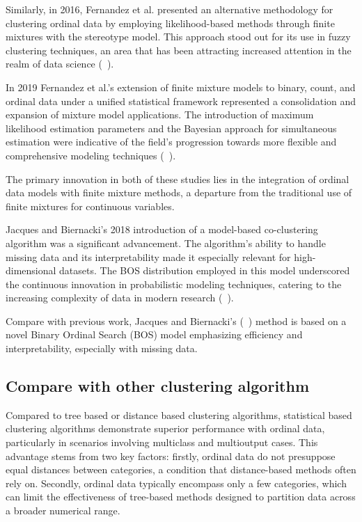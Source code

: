 \documentclass{article}
\begin{document}
Similarly, in 2016, Fernandez et al. presented an alternative methodology for clustering ordinal data by employing likelihood-based methods through finite mixtures with the stereotype model. This approach stood out for its use in fuzzy clustering techniques, an area that has been attracting increased attention in the realm of data science (~\cite{fernandez2016mixture}).

In 2019 Fernandez et al.'s extension of finite mixture models to binary, count, and ordinal data under a unified statistical framework represented a consolidation and expansion of mixture model applications. The introduction of maximum likelihood estimation parameters and the Bayesian approach for simultaneous estimation were indicative of the field's progression towards more flexible and comprehensive modeling techniques (~\cite{fernandez2019finite}).

The primary innovation in both of these studies lies in the integration of ordinal data models with finite mixture methods, a departure from the traditional use of finite mixtures for continuous variables.


Jacques and Biernacki's 2018 introduction of a model-based co-clustering algorithm was a significant advancement. The algorithm's ability to handle missing data and its interpretability made it especially relevant for high-dimensional datasets. The BOS distribution employed in this model underscored the continuous innovation in probabilistic modeling techniques, catering to the increasing complexity of data in modern research (~\cite{jacques2018model}).

Compare with previous work, Jacques and Biernacki's (~\cite{jacques2018model}) method is based on a novel Binary Ordinal Search (BOS) model emphasizing efficiency and interpretability, especially with missing data. 

\subsection{Compare with other clustering algorithm}

Compared to tree based or distance based clustering algorithms, statistical based clustering algorithms demonstrate superior performance with ordinal data, particularly in scenarios involving multiclass and multioutput cases. 
This advantage stems from two key factors: firstly, ordinal data do not presuppose equal distances between categories, a condition that distance-based methods often rely on. Secondly, ordinal data typically encompass only a few categories, which can limit the effectiveness of tree-based methods designed to partition data across a broader numerical range.
\end{document}
